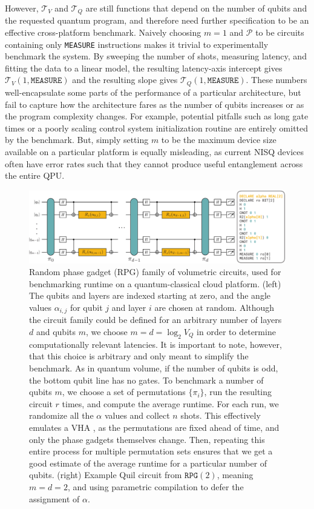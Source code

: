 \documentclass[12pt]{iopart}
\begin{document}
However, $\mathcal{T}_V$ and $\mathcal{T}_Q$ are still functions that depend on the number of qubits and the requested quantum program, and therefore need further specification to be an effective cross-platform benchmark. Naively choosing $m = 1$ and $\mathcal{P}$ to be circuits containing only \texttt{MEASURE} instructions makes it trivial to experimentally benchmark the system. By sweeping the number of shots, measuring latency, and fitting the data to a linear model, the resulting latency-axis intercept gives $\mathcal{T}_V(1, \texttt{MEASURE})$ and the resulting slope gives $\mathcal{T}_Q(1,\texttt{MEASURE})$. These numbers well-encapsulate some parts of the performance of a particular architecture, but fail to capture how the architecture fares as the number of qubits increases or as the program complexity changes. For example, potential pitfalls such as long gate times or a poorly scaling control system initialization routine are entirely omitted by the benchmark. But, simply setting $m$ to be the maximum device size available on a particular platform is equally misleading, as current NISQ devices often have error rates such that they cannot produce useful entanglement across the entire QPU.

\begin{figure}
    \centering
    \includegraphics[width=\textwidth]{figures/phase-gadget-benchmark.pdf}
    \caption{
    Random phase gadget (RPG) family of volumetric circuits, used for benchmarking runtime on a quantum-classical cloud platform. (left) The qubits and layers are indexed starting at zero, and the angle values $\alpha_{i,j}$ for qubit $j$ and layer $i$ are chosen at random. Although the circuit family could be defined for an arbitrary number of layers $d$ and qubits $m$, we choose $m = d = \log_{2}{V_Q}$ in order to determine computationally relevant latencies. It is important to note, however, that this choice is arbitrary and only meant to simplify the benchmark. As in quantum volume, if the number of qubits is odd, the bottom qubit line has no gates. To benchmark a number of qubits $m$, we choose a set of permutations $\{\pi_i\}$, run the resulting circuit $r$ times, and compute the average runtime. For each run, we randomize all the $\alpha$ values and collect $n$ shots. This effectively emulates a VHA \cite{CrooksQAOA}, as the permutations are fixed ahead of time, and only the phase gadgets themselves change. Then, repeating this entire process for multiple permutation sets ensures that we get a good estimate of the average runtime for a particular number of qubits.  (right) Example Quil circuit from $\texttt{RPG}(2)$, meaning $m = d = 2$, and using parametric compilation to defer the assignment of $\alpha$.}
    \label{fig:Phase-Gadget}
\end{figure}
\end{document}
